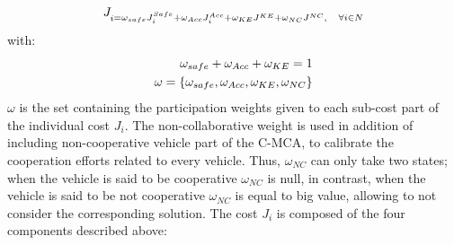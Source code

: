  \begin{align} \label{eq: objectivefunctionnegotiation}
     J_{\substack{ i } = \omega_{safe} J_{i}^{\tiny{Safe}} + \omega_{\tiny{Acc}} J_{i}^{Acc} +\omega_{\tiny{KE}}
     J^{\tiny{KE}} +\omega_{\tiny{\substack{NC}}}J^{\tiny{NC}}, \; \;\;\; \forall i  \in {N}}
 \end{align}
with: 
 \begin{align}
     \omega_{safe} + \omega_{\tiny{Acc}} + \omega_{\tiny{KE}} =1 \\ 
     \omega=\{\omega_{safe}, \omega_{\tiny{Acc}}, \omega_{\tiny{KE}},  \omega_{\tiny{NC}}   \}
 \end{align} 
$\omega$ is the set containing the participation weights given to each sub-cost part of the individual cost $J_{i}$. The non-collaborative weight is used in addition of including non-cooperative vehicle part of the C-MCA, to calibrate the cooperation efforts related to every vehicle. Thus,  $\omega_{NC}$ can only take two states; when the vehicle is said to be cooperative $\omega_{NC}$ is null, in contrast, when the vehicle is said to be not cooperative $\omega_{NC}$ is equal to big value, allowing to not consider the corresponding solution. The cost $J_i$ is composed of the four components described above: 
 
 
 
